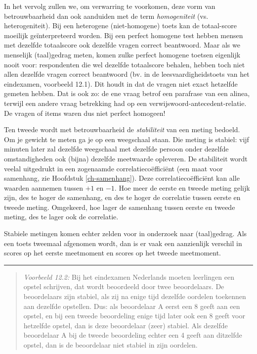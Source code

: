 \documentclass[
]{book}
\begin{document}
In het vervolg zullen we, om verwarring te voorkomen, deze vorm van
betrouwbaarheid dan ook aanduiden met de term \emph{homogeniteit} (vs.
heterogeniteit). Bij een heterogene (niet-homogene) toets kan de
totaal-score moeilijk geïnterpreteerd worden. Bij een perfect homogene
test hebben mensen met dezelfde totaalscore ook dezelfde vragen correct
beantwoord. Maar als we menselijk (taal)gedrag meten, komen zulke
perfect homogene toetsen eigenlijk nooit voor: respondenten die wel
dezelfde totaalscore behalen, hebben toch niet allen dezelfde vragen
correct beantwoord (bv. in de leesvaardigheidstoets van het eindexamen,
voorbeeld 12.1). Dit houdt in dat de
vragen niet exact hetzelfde gemeten hebben. Dat is ook zo: de ene vraag
betrof een parafrase van een alinea, terwijl een andere vraag betrekking
had op een verwijswoord-antecedent-relatie. De vragen of items waren dus
niet perfect homogeen!

Ten tweede wordt met betrouwbaarheid de \emph{stabiliteit} van een meting
bedoeld. Om je gewicht te meten ga je op een weegschaal staan. Die
meting is stabiel: vijf minuten later zal dezelfde weegschaal met
dezelfde persoon onder dezelfde omstandigheden ook (bijna) dezelfde meetwaarde
opleveren. De stabiliteit wordt veelal uitgedrukt in een zogenaamde
correlatiecoëfficiënt (een maat voor samenhang, zie Hoofdstuk
\ref{ch-samenhang}). Deze correlatiecoëfficiënt kan alle waarden
aannemen tussen \(+1\) en \(-1\). Hoe meer de eerste en tweede meting gelijk
zijn, des te hoger de samenhang, en des te hoger de correlatie tussen
eerste en tweede meting. Omgekeerd, hoe lager de samenhang tussen eerste
en tweede meting, des te lager ook de correlatie.

Stabiele metingen komen echter zelden voor in onderzoek naar
(taal)gedrag. Als een toets tweemaal afgenomen wordt, dan is er vaak een
aanzienlijk verschil in scores op het eerste meetmoment en scores op het
tweede meetmoment.

\begin{center}\rule{0.5\linewidth}{0.5pt}\end{center}

\begin{quote}
\emph{Voorbeeld 12.2:}
Bij het eindexamen Nederlands moeten leerlingen een opstel schrijven,
dat wordt beoordeeld door twee beoordelaars. De beoordelaars zijn
stabiel, als zij na enige tijd dezelfde oordelen toekennen aan dezelfde
opstellen. Dus: als beoordelaar A eerst een 8 geeft aan een opstel, en
bij een tweede beoordeling enige tijd later ook een 8 geeft voor
hetzelfde opstel, dan is deze beoordelaar (zeer) stabiel. Als dezelfde
beoordelaar A bij de tweede beoordeling echter een 4 geeft aan ditzelfde
opstel, dan is de beoordelaar niet stabiel in zijn oordelen.
\end{quote}
\end{document}
